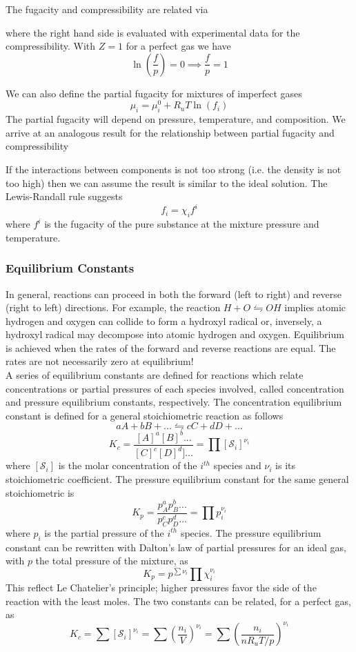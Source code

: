 \documentclass[11pt]{article}
\newcommand{\CenteredBoxed}[1]{\begin{center}\boxed{#1}\end{center}}
\newcommand{\intlim}[2]{\int\limits_{#1}^{#2}}
\begin{document}
The fugacity and compressibility are related via
\CenteredBoxed{\ln\left(\frac{f}{p}\right)=\intlim{0}{p}(Z-1)\frac{d\xi}{\xi}}
where the right hand side is evaluated with experimental data for the compressibility. With $Z=1$ for a perfect gas we have
$$\ln\left(\frac{f}{p}\right)=0\implies\frac{f}{p}=1$$

We can also define the partial fugacity for mixtures of imperfect gases
$$\mu_i=\mu_i^0 + R_uT\ln(f_i)$$
The partial fugacity will depend on pressure, temperature, and composition. We arrive at an analogous result for the relationship between partial fugacity and compressibility
\CenteredBoxed{\ln\left(\frac{f_i}{p_i}\right) = \intlim{0}{p}\left(\frac{\hat{\nu}_i}{R_uT}-\frac{1}{\xi}\right)d\xi}

If the interactions between components is not too strong (i.e. the density is not too high) then we can assume the result is similar to the ideal solution. The Lewis-Randall rule suggests
$$f_i=\chi_if^i$$
where $f^i$ is the fugacity of the pure substance at the mixture pressure and temperature.

\subsubsection{Equilibrium Constants}
In general, reactions can proceed in both the forward (left to right) and reverse (right to left) directions. For example, the reaction $H+O\leftrightharpoons OH$ implies atomic hydrogen and oxygen can collide to form a hydroxyl radical or, inversely, a hydroxyl radical may decompose into atomic hydrogen and oxygen. Equilibrium is achieved when the rates of the forward and reverse reactions are equal. The rates are not necessarily zero at equilibrium!\\

A series of equilibrium constants are defined for reactions which relate concentrations or partial pressures of each species involved, called concentration and pressure equilibrium constants, respectively. The concentration equilibrium constant is defined for a general stoichiometric reaction as follows
$$aA+bB+...\leftrightharpoons cC + dD +...$$
$$K_c = \frac{[A]^a[B]^b...}{[C]^c[D]^d]...}=\prod[\mathcal{S}_i]^{\nu_i}$$
where $[\mathcal{S}_i]$ is the molar concentration of the $i^{th}$ species and $\nu_i$ is its stoichiometric coefficient. The pressure equilibrium constant for the same general stoichiometric  is
$$K_p=\frac{p_A^ap_B^b...}{p_C^cp_D^d...}=\prod p_i^{\nu_i}$$
where $p_i$ is the partial pressure of the $i^{th}$ species. The pressure equilibrium constant can be rewritten with Dalton's law of partial pressures for an ideal gas, with $p$ the total pressure of the mixture, as
$$K_p=p^{\sum\nu_i}\prod\chi_i^{\nu_i}$$
This reflect Le Chatelier's principle; higher pressures favor the side of the reaction with the least moles. The two constants can be related, for a perfect gas, as
$$K_c = \sum[\mathcal{S}_i]^{\nu_i}=\sum\left(\frac{n_i}{V}\right)^{\nu_i}=\sum\left(\frac{n_i}{nR_uT/p}\right)^{\nu_i}$$
\CenteredBoxed{K_c = \left(\frac{1}{R_uT}\right)^{\sum\nu_i}\sum\left(p\chi_i\right)^{\nu_i}=\frac{1}{R_uT}K_p}
\end{document}
